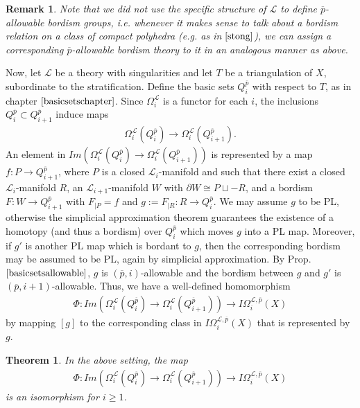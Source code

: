 \documentclass{scrreprt}
\newtheorem{theorem}[prop]{Theorem}
\newtheorem{remark}[prop]{Remark}
\begin{document}
\begin{remark}
Note that we did not use the specific structure of $\mathcal{L}$ to define $\overline{p}$-allowable bordism groups, i.e. whenever it makes sense to talk about a bordism relation on a class of compact polyhedra (e.g. as in $\cite{stong}$), we can assign a corresponding $\overline{p}$-allowable bordism theory to it in an analogous manner as above. 
\end{remark}

Now, let $\mathcal{L}$ be a theory with singularities and let $T$ be a triangulation of $X$, subordinate to the stratification. Define the basic sets $Q_i^{\overline{p}}$ with respect to $T$, as in chapter $\ref{basicsetschapter}$. Since $\Omega_i^{\mathcal{L}}$ is a functor for each $i$, the inclusions $Q_i^{\overline{p}} \subset Q_{i+1}^{\overline{p}}$ induce maps
\begin{align*}
\Omega_i^{\mathcal{L}}(Q_{i}^{\overline{p}}) \to \Omega_i^{\mathcal{L}}(Q_{i+1}^{\overline{p}}).
\end{align*}
An element in $Im(\Omega_i^{\mathcal{L}}(Q_{i}^{\overline{p}}) \to \Omega_i^{\mathcal{L}}(Q_{i+1}^{\overline{p}}))$ is represented by a map $f: P \to Q_{i+1}^{\overline{p}}$, where $P$ is a closed $\mathcal{L}_i$-manifold and such that there exist a closed $\mathcal{L}_i$-manifold $R$, an $\mathcal{L}_{i+1}$-manifold $W$ with $\partial W \cong P \sqcup -R$, and a bordism $F: W \to Q_{i+1}^{\overline{p}}$ with $F_{|P}=f$ and $g:=F_{|R}: R \to Q_{i}^{\overline{p}}$. We may assume $g$ to be PL, otherwise the simplicial approximation theorem guarantees the existence of a homotopy (and thus a bordism) over $Q_i^{\overline{p}}$ which moves $g$ into a PL map. Moreover, if $g'$ is another PL map which is bordant to $g$, then the corresponding bordism may be assumed to be PL, again by simplicial approximation. By Prop.$\ref{basicsetsallowable}$, $g$ is $(\overline{p},i)$-allowable and the bordism between $g$ and $g'$ is $(\overline{p},i+1)$-allowable. Thus, we have a well-defined homomorphism
\begin{align*}
\Phi : Im(\Omega_i^{\mathcal{L}}(Q_{i}^{\overline{p}}) \to \Omega_i^{\mathcal{L}}(Q_{i+1}^{\overline{p}})) \to I\Omega_i^{\mathcal{L}, \overline{p}}(X)
\end{align*}
by mapping $[g]$ to the corresponding class in $I\Omega_i^{\mathcal{L}, \overline{p}}(X)$ that is represented by $g$.

\begin{theorem}\label{maintheorem}
In the above setting, the map
\begin{align*}
\Phi : Im(\Omega_i^{\mathcal{L}}(Q_{i}^{\overline{p}}) \to \Omega_i^{\mathcal{L}}(Q_{i+1}^{\overline{p}})) \to I\Omega_i^{\mathcal{L}, \overline{p}}(X)
\end{align*}
is an isomorphism for $i \geq 1$.
\end{theorem}
\end{document}
